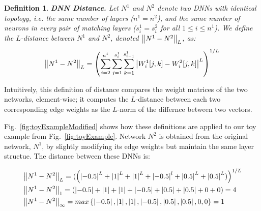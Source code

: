 \documentclass{easychair}
\newtheorem{definition}{Definition}
\newcommand{\guy}[1]{\marginpar{\textcolor{orange}{Guy: #1}}}
\begin{document}
\begin{definition}\textbf{DNN Distance.}
  Let $N^1$ and $N^2$ denote two DNNs with identical topology,
  i.e. the same number of layers ($n^1=n^2$), and the same number of
  neurons in every pair of matching layers ($s_i^1=s_i^2$ for all
  $1\leq i \leq n^1$). We define the $L$-distance between $N^1$ and $N^2$,
  denoted $\left\lVert N^1-N^2\right\rVert_L$, as:
  \[
    \left\lVert N^1-N^2\right\rVert_L =    \left(\sum_{i=2}^{n^1}\sum_{j=1}^{s_{i}^1}\sum_{k=1}^{s_{i-1}^1}
    \left\lvert W^1_i[j,k] - W^2_i[j,k]\right\rvert^L\right)^{1/L}
  \]
\end{definition}

Intuitively, this definition of distance compares the weight matrices
of the two networks, element-wise; it computes the $L$-distance
between each two corresponding edge weights as the $L$-norm of the differnce between two vectors.

Fig.~\ref{fig:toyExampleModified} shows how these definitions are applied
to our toy example from Fig.~\ref{fig:toyExample}. Network $N^2$ is
obtained from the original network, $N^1$, by slightly modifying its
edge weights but maintain the same layer structue. The distance
between these DNNs is:
\guy{Ben: does this definition even work for $L_\infty$? Maybe we should
  write that we we treat all weights as a long vector, and compute the
  norm of the vector of differences}

\begin{align*}
	&\left\lVert N^1-N^2\right\rVert_L=(\left(\left\lvert-0.5\right\rvert^L+\left\lvert1\right\rvert^L+\left\lvert1\right\rvert^L+\left\lvert-0.5\right\rvert^l+\left\lvert0.5\right\rvert^L+\left\lvert0.5\right\rvert^L)\right)^{1/L}\\
	&\left\lVert N^1-N^2\right\rVert_1=(\left\lvert-0.5\right\rvert+\left\lvert1\right\rvert+\left\lvert1\right\rvert+\left\lvert-0.5\right\rvert+\left\lvert0.5\right\rvert+\left\lvert0.5\right\rvert+0+0)=4\\
	&\left\lVert N^1-N^2\right\rVert_\infty=max\left\lbrace \left\lvert-0.5\right\rvert,\left\lvert1\right\rvert,\left\lvert1\right\rvert,\left\lvert-0.5\right\rvert,\left\lvert0.5\right\rvert,\left\lvert0.5\right\rvert,0,0\right\rbrace=1
\end{align*}
\end{document}
